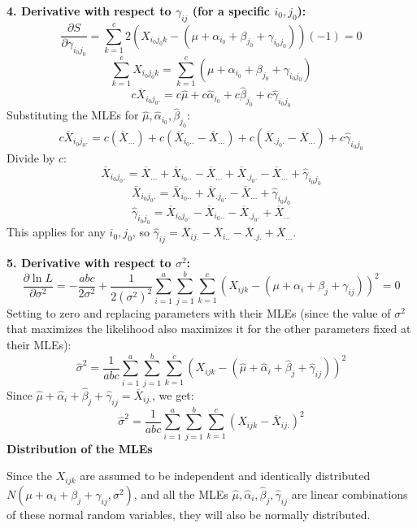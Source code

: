 \textbf{4. Derivative with respect to $\gamma_{ij}$ (for a specific $i_0, j_0$):}
\[
\frac{\partial S}{\partial \gamma_{i_0j_0}} = \sum_{k=1}^{c} 2(X_{i_0j_0k} - (\mu + \alpha_{i_0} + \beta_{j_0} + \gamma_{i_0j_0}))(-1) = 0
\]
\[
\sum_{k=1}^{c} X_{i_0j_0k} = \sum_{k=1}^{c} (\mu + \alpha_{i_0} + \beta_{j_0} + \gamma_{i_0j_0})
\]
\[
c \overline{X}_{i_0j_0.} = c\widehat{\mu} + c\widehat{\alpha}_{i_0} + c\widehat{\beta}_{j_0} + c\widehat{\gamma}_{i_0j_0}
\]
Substituting the MLEs for $\widehat{\mu}, \widehat{\alpha}_{i_0}, \widehat{\beta}_{j_0}$:
\[
c \overline{X}_{i_0j_0.} = c(\overline{X}_{...}) + c(\overline{X}_{i_0..} - \overline{X}_{...}) + c(\overline{X}_{.j_0.} - \overline{X}_{...}) + c\widehat{\gamma}_{i_0j_0}
\]
Divide by $c$:
\[
\overline{X}_{i_0j_0.} = \overline{X}_{...} + \overline{X}_{i_0..} - \overline{X}_{...} + \overline{X}_{.j_0.} - \overline{X}_{...} + \widehat{\gamma}_{i_0j_0}
\]
\[
\overline{X}_{i_0j_0.} = \overline{X}_{i_0..} + \overline{X}_{.j_0.} - \overline{X}_{...} + \widehat{\gamma}_{i_0j_0}
\]
\[
\widehat{\gamma}_{i_0j_0} = \overline{X}_{i_0j_0.} - \overline{X}_{i_0..} - \overline{X}_{.j_0.} + \overline{X}_{...}
\]
This applies for any $i_0, j_0$, so $\widehat{\gamma}_{ij} = \overline{X}_{ij.} - \overline{X}_{i..} - \overline{X}_{.j.} + \overline{X}_{...}$.

\textbf{5. Derivative with respect to $\sigma^2$:}
\[
\frac{\partial \ln L}{\partial \sigma^2} = -\frac{abc}{2\sigma^2} + \frac{1}{2(\sigma^2)^2} \sum_{i=1}^{a} \sum_{j=1}^{b} \sum_{k=1}^{c} (X_{ijk} - (\mu + \alpha_i + \beta_j + \gamma_{ij}))^2 = 0
\]
Setting to zero and replacing parameters with their MLEs (since the value of $\sigma^2$ that maximizes the likelihood also maximizes it for the other parameters fixed at their MLEs):
\[
\widehat{\sigma}^2 = \frac{1}{abc} \sum_{i=1}^{a} \sum_{j=1}^{b} \sum_{k=1}^{c} (X_{ijk} - (\widehat{\mu} + \widehat{\alpha}_i + \widehat{\beta}_j + \widehat{\gamma}_{ij}))^2
\]
Since $\widehat{\mu} + \widehat{\alpha}_i + \widehat{\beta}_j + \widehat{\gamma}_{ij} = \overline{X}_{ij.}$, we get:
\[
\widehat{\sigma}^2 = \frac{1}{abc} \sum_{i=1}^{a} \sum_{j=1}^{b} \sum_{k=1}^{c} (X_{ijk} - \overline{X}_{ij.})^2
\]
\textbf{Distribution of the MLEs}

Since the $X_{ijk}$ are assumed to be independent and identically distributed $N(\mu + \alpha_i + \beta_j + \gamma_{ij}, \sigma^2)$, and all the MLEs $\widehat{\mu}, \widehat{\alpha}_i, \widehat{\beta}_j, \widehat{\gamma}_{ij}$ are linear combinations of these normal random variables, they will also be normally distributed.

